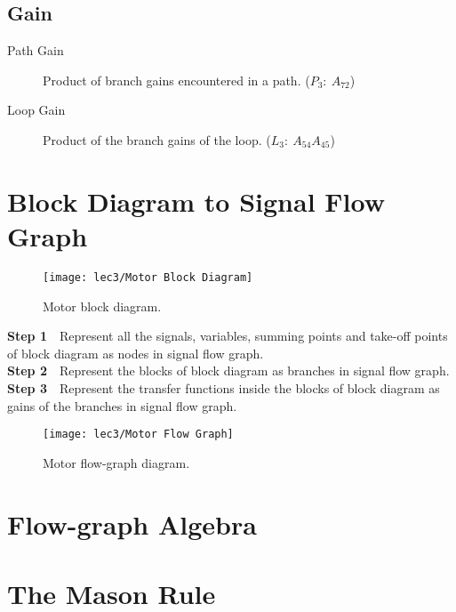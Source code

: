 \subsection{Gain}
	
\begin{description}
	\item[Path Gain]  Product of branch gains encountered in a path. ($P_3:\ A_{72}$)
	\item[Loop Gain]  Product of the branch gains of the loop. ($L_3:\ A_{54}A_{45}$)
\end{description}

\section[Block to Flow-graph]{Block Diagram to Signal Flow Graph}

\begin{figure}[h]
			\centering
			\texttt{[image: lec3/Motor Block Diagram]}
			\caption{Motor block diagram.}
\end{figure}

\textbf{Step 1}\ \  Represent all the signals, variables,
summing points and take-off points of block diagram as nodes in signal flow graph.\\
\textbf{Step 2}\ \  Represent the blocks of block diagram as branches in signal flow graph.\\
\textbf{Step 3}\ \  Represent the transfer functions inside the blocks of block diagram as 
gains of the branches in signal flow graph.\\[+2em]

\begin{figure}[h]
			\raggedleft
			\texttt{[image: lec3/Motor Flow Graph]}
			\caption{Motor flow-graph diagram.}
\end{figure}

\section[Flow-graph Algebra]{Flow-graph Algebra}

\blindtext

\section{The Mason Rule}

\blindtext
